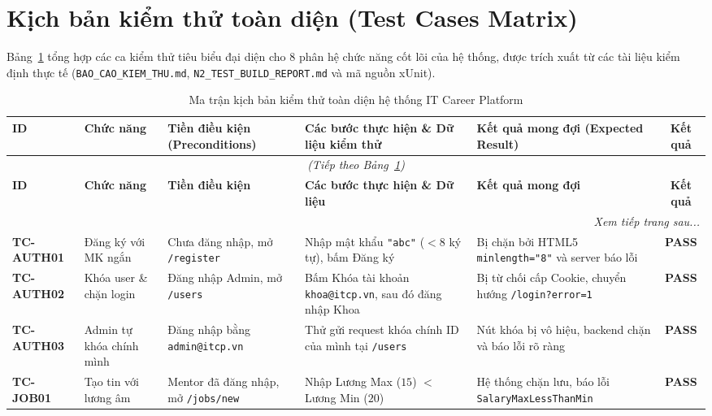 \section{Kịch bản kiểm thử toàn diện (Test Cases Matrix)}
\label{sec:kich-ban-kiem-thu}

Bảng~\ref{tab:test-cases-matrix} tổng hợp các ca kiểm thử tiêu biểu đại diện cho 8 phân hệ chức năng cốt lõi của hệ thống, được trích xuất từ các tài liệu kiểm định thực tế (\texttt{BAO\_CAO\_KIEM\_THU.md}, \texttt{N2\_TEST\_BUILD\_REPORT.md} và mã nguồn xUnit).

{\small
\begin{longtable}{p{1.6cm} p{2.2cm} p{2.7cm} p{3.4cm} p{3.4cm} c}
\caption{Ma trận kịch bản kiểm thử toàn diện hệ thống IT Career Platform} \label{tab:test-cases-matrix} \\
\toprule
\textbf{ID} & \textbf{Chức năng} & \textbf{Tiền điều kiện (Preconditions)} & \textbf{Các bước thực hiện \& Dữ liệu kiểm thử} & \textbf{Kết quả mong đợi (Expected Result)} & \textbf{Kết quả} \\
\midrule
\endfirsthead
\multicolumn{6}{c}{\textit{(Tiếp theo Bảng~\ref{tab:test-cases-matrix})}} \\
\toprule
\textbf{ID} & \textbf{Chức năng} & \textbf{Tiền điều kiện} & \textbf{Các bước thực hiện \& Dữ liệu} & \textbf{Kết quả mong đợi} & \textbf{Kết quả} \\
\midrule
\endhead
\midrule
\multicolumn{6}{r}{\textit{Xem tiếp trang sau...}} \\
\bottomrule
\endfoot
\bottomrule
\endlastfoot
\textbf{TC-AUTH01} & Đăng ký với MK ngắn & Chưa đăng nhập, mở \texttt{/register} & Nhập mật khẩu \texttt{"abc"} ($<8$ ký tự), bấm Đăng ký & Bị chặn bởi HTML5 \texttt{minlength="8"} và server báo lỗi & \textbf{PASS} \\
\addlinespace
\textbf{TC-AUTH02} & Khóa user \& chặn login & Đăng nhập Admin, mở \texttt{/users} & Bấm Khóa tài khoản \texttt{khoa@itcp.vn}, sau đó đăng nhập Khoa & Bị từ chối cấp Cookie, chuyển hướng \texttt{/login?error=1} & \textbf{PASS} \\
\addlinespace
\textbf{TC-AUTH03} & Admin tự khóa chính mình & Đăng nhập bằng \texttt{admin@itcp.vn} & Thử gửi request khóa chính ID của mình tại \texttt{/users} & Nút khóa bị vô hiệu, backend chặn và báo lỗi rõ ràng & \textbf{PASS} \\
\midrule
\textbf{TC-JOB01} & Tạo tin với lương âm & Mentor đã đăng nhập, mở \texttt{/jobs/new} & Nhập Lương Max ($15$) $<$ Lương Min ($20$) & Hệ thống chặn lưu, báo lỗi \texttt{SalaryMaxLessThanMin} & \textbf{PASS} \\

\end{longtable}}
